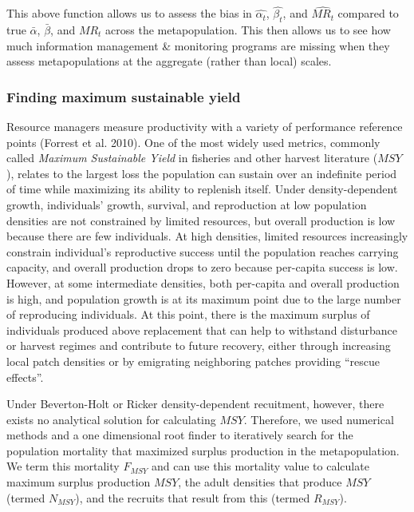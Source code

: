 \documentclass[]{article}
\begin{document}
This above function allows us to assess the bias in \(\hat{\alpha_t}\),
\(\hat{\beta_t}\), and \(\hat{MR_t}\) compared to true \(\bar{\alpha}\),
\(\bar{\beta}\), and \({MR}_t\) across the metapopulation. This then
allows us to see how much information management \& monitoring programs
are missing when they assess metapopulations at the aggregate (rather
than local) scales.

\hypertarget{finding-maximum-sustainable-yield}{%
\subsubsection{Finding maximum sustainable
yield}\label{finding-maximum-sustainable-yield}}

Resource managers measure productivity with a variety of performance
reference points (Forrest et al. 2010). One of the most widely used
metrics, commonly called \emph{Maximum Sustainable Yield} in fisheries
and other harvest literature (\(MSY\)), relates to the largest loss the
population can sustain over an indefinite period of time while
maximizing its ability to replenish itself. Under density-dependent
growth, individuals' growth, survival, and reproduction at low
population densities are not constrained by limited resources, but
overall production is low because there are few individuals. At high
densities, limited resources increasingly constrain individual's
reproductive success until the population reaches carrying capacity, and
overall production drops to zero because per-capita success is low.
However, at some intermediate densities, both per-capita and overall
production is high, and population growth is at its maximum point due to
the large number of reproducing individuals. At this point, there is the
maximum surplus of individuals produced above replacement that can help
to withstand disturbance or harvest regimes and contribute to future
recovery, either through increasing local patch densities or by
emigrating neighboring patches providing ``rescue effects''.

Under Beverton-Holt or Ricker density-dependent recuitment, however,
there exists no analytical solution for calculating \(MSY\). Therefore,
we used numerical methods and a one dimensional root finder to
iteratively search for the population mortality that maximized surplus
production in the metapopulation. We term this mortality \(F_{MSY}\) and
can use this mortality value to calculate maximum surplus production
\(MSY\), the adult densities that produce \(MSY\) (termed \(N_{MSY}\)),
and the recruits that result from this (termed \(R_{MSY}\)).
\end{document}
